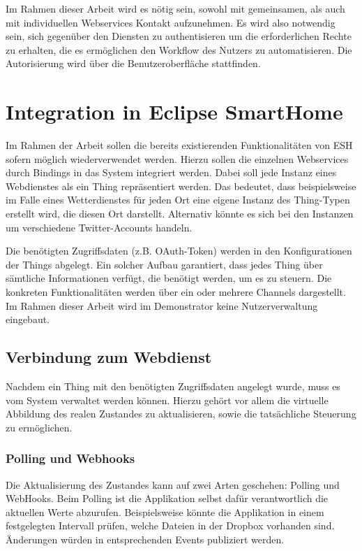 Im Rahmen dieser Arbeit wird es nötig sein, sowohl mit gemeinsamen, als auch mit individuellen Webservices Kontakt aufzunehmen. Es wird also notwendig sein, sich gegenüber den Diensten zu authentisieren um die erforderlichen Rechte zu erhalten, die es ermöglichen den Workflow des Nutzers zu automatisieren. Die Autorisierung wird über die Benutzeroberfläche stattfinden.



\section{Integration in Eclipse SmartHome}
\label{sec:integrationESH}
Im Rahmen der Arbeit sollen die bereits existierenden Funktionalitäten von ESH sofern möglich wiederverwendet werden. Hierzu sollen die einzelnen Webservices durch Bindings in das System integriert werden. 
Dabei soll jede Instanz eines Webdienstes als ein Thing repräsentiert werden. Das bedeutet, dass beispielsweise im Falle eines Wetterdienstes für jeden Ort eine eigene Instanz des Thing-Typen erstellt wird, die diesen Ort darstellt. Alternativ könnte es sich bei den Instanzen um verschiedene Twitter-Accounts handeln.

Die benötigten Zugriffsdaten (z.B. OAuth-Token) werden in den Konfigurationen der Things abgelegt. Ein solcher Aufbau garantiert, dass jedes Thing über sämtliche Informationen verfügt, die benötigt werden, um es zu steuern. Die konkreten Funktionalitäten werden über ein oder mehrere Channels dargestellt. Im Rahmen dieser Arbeit wird im Demonstrator keine Nutzerverwaltung eingebaut.


\subsection{Verbindung zum Webdienst}
Nachdem ein Thing mit den benötigten Zugriffsdaten angelegt wurde, muss es vom System verwaltet werden können. Hierzu gehört vor allem die virtuelle Abbildung des realen Zustandes zu aktualisieren, sowie die tatsächliche Steuerung zu ermöglichen. 

\subsubsection{Polling und Webhooks}
Die Aktualisierung des Zustandes kann auf zwei Arten geschehen: Polling und WebHooks. Beim Polling ist die Applikation selbst dafür verantwortlich die aktuellen Werte abzurufen. Beispielsweise könnte die Applikation in einem festgelegten Intervall prüfen, welche Dateien in der Dropbox vorhanden sind. Änderungen würden in entsprechenden Events publiziert werden.\\

